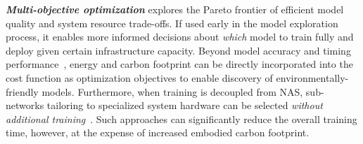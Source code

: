 \textbf{\emph{Multi-objective optimization}} explores the Pareto frontier of efficient model quality and system resource trade-offs. If used early in the model exploration process, it enables more informed decisions about \textit{which} model to train fully and deploy given certain infrastructure capacity. 
% 
Beyond model accuracy and timing performance~\cite{Song:kdd:2020,Joglekar:kdd:2020,Tan:arxiv:2020,eriksson2021latencyNAS}, energy and carbon footprint can be directly incorporated into the cost function as optimization objectives %
to enable discovery of environmentally-friendly models. 
Furthermore, when training is decoupled from NAS, sub-networks tailoring to specialized system hardware can be selected \textit{without additional training}~\cite{cai:arxiv:2020,Stamoulis:arxiv:2019,Chen:arxiv:2021,Mellor:arxiv:2021}. Such approaches can significantly reduce the overall training time, however, at the expense of increased embodied carbon footprint.

